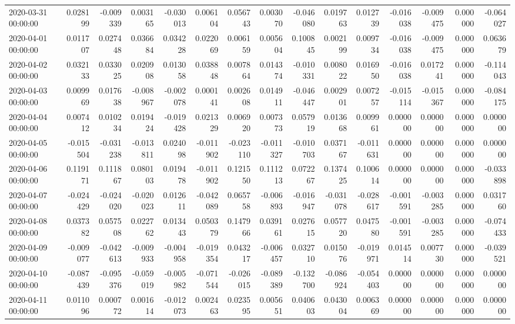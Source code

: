 \begin{tabular}{lrrrrrrrrrrrrrr}
2020-03-31 00:00:00 & 0.028199 & -0.009339 & 0.003165 & -0.030013 & 0.006104 & 0.056743 & 0.003070 & -0.046080 & 0.019763 & 0.012739 & -0.016038 & -0.009475 & 0.000000 & -0.064027 \\
2020-04-01 00:00:00 & 0.011707 & 0.027448 & 0.036684 & 0.034228 & 0.022069 & 0.006159 & 0.005604 & 0.100845 & 0.002199 & 0.009734 & -0.016038 & -0.009475 & 0.000000 & 0.063679 \\
2020-04-02 00:00:00 & 0.032133 & 0.033025 & 0.020908 & 0.013058 & 0.038848 & 0.007864 & 0.014374 & -0.010331 & 0.008022 & 0.016950 & -0.016038 & 0.017241 & 0.000000 & -0.114043 \\
2020-04-03 00:00:00 & 0.009969 & 0.017638 & -0.008967 & -0.002078 & 0.000141 & 0.002608 & 0.014911 & -0.046447 & 0.002901 & 0.007257 & -0.015114 & -0.015367 & 0.000000 & -0.084175 \\
2020-04-04 00:00:00 & 0.007412 & 0.010234 & 0.019424 & -0.019428 & 0.021329 & 0.006920 & 0.007373 & 0.057919 & 0.013668 & 0.009961 & 0.000000 & 0.000000 & 0.000000 & 0.000000 \\
2020-04-05 00:00:00 & -0.015504 & -0.031238 & -0.013811 & 0.024098 & -0.011902 & -0.023110 & -0.011327 & -0.010703 & 0.037167 & -0.011631 & 0.000000 & 0.000000 & 0.000000 & 0.000000 \\
2020-04-06 00:00:00 & 0.119171 & 0.111867 & 0.080103 & 0.019478 & -0.011902 & 0.121550 & 0.111213 & 0.072267 & 0.137425 & 0.100614 & 0.000000 & 0.000000 & 0.000000 & -0.033898 \\
2020-04-07 00:00:00 & -0.024429 & -0.024020 & -0.020023 & 0.012611 & -0.042089 & 0.065758 & -0.006893 & -0.016947 & -0.031078 & -0.028617 & -0.001591 & -0.003285 & 0.000000 & 0.031760 \\
2020-04-08 00:00:00 & 0.037382 & 0.057508 & 0.022762 & 0.013443 & 0.050379 & 0.147966 & 0.039161 & 0.027615 & 0.057720 & 0.047580 & -0.001591 & -0.003285 & 0.000000 & -0.074433 \\
2020-04-09 00:00:00 & -0.009077 & -0.042613 & -0.009933 & -0.004958 & -0.019354 & 0.043217 & -0.006457 & 0.032710 & 0.015076 & -0.019971 & 0.014514 & 0.007730 & 0.000000 & -0.039521 \\
2020-04-10 00:00:00 & -0.087439 & -0.095376 & -0.059019 & -0.005982 & -0.071544 & -0.026015 & -0.089389 & -0.132700 & -0.086924 & -0.054403 & 0.000000 & 0.000000 & 0.000000 & 0.000000 \\
2020-04-11 00:00:00 & 0.011096 & 0.000772 & 0.001614 & -0.012073 & 0.002463 & 0.023595 & 0.005651 & 0.040603 & 0.043004 & 0.006369 & 0.000000 & 0.000000 & 0.000000 & 0.000000 \\

\end{tabular}
